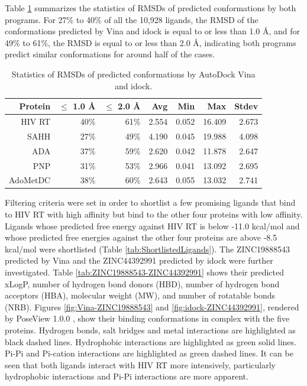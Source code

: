 Table \ref{tab:DockingRMSD} summarizes the statistics of RMSDs of predicted conformations by both programs. For 27\% to 40\% of all the 10,928 ligands, the RMSD of the conformations predicted by Vina and idock is equal to or less than 1.0 \AA, and for 49\% to 61\%, the RMSD is equal to or less than 2.0 \AA, indicating both programs predict similar conformations for around half of the cases.

\begin{table}
\centering
\begin{tabular*}
{\textwidth}
{@{\extracolsep{\fill}}rrrrrrr}
\toprule
Protein & $\leq$ 1.0 \AA & $\leq$ 2.0 \AA & Avg & Min & Max & Stdev\\
\midrule
HIV RT     & 40\% & 61\% & 2.554 & 0.052 & 16.409 & 2.673\\
SAHH       & 27\% & 49\% & 4.190 & 0.045 & 19.988 & 4.098\\
ADA         & 37\% & 59\% & 2.620 & 0.042 & 11.878 & 2.647\\
PNP          & 31\% & 53\% & 2.966 & 0.041 & 13.092 & 2.695\\
AdoMetDC & 38\% & 60\% & 2.643 & 0.055 & 13.032 & 2.741\\
\bottomrule
\end{tabular*}
\caption{Statistics of RMSDs of predicted conformations by AutoDock Vina and idock.}
\label{tab:DockingRMSD}
\end{table}

Filtering criteria were set in order to shortlist a few promising ligands that bind to HIV RT with high affinity but bind to the other four proteins with low affinity. Ligands whose predicted free energy against HIV RT is below -11.0 kcal/mol and whose predicted free energies against the other four proteins are above -8.5 kcal/mol were shortlisted (Table \ref{tab:ShortlistedLigands}). The ZINC19888543 predicted by Vina and the ZINC44392991 predicted by idock were further investigated. Table \ref{tab:ZINC19888543-ZINC44392991} shows their predicted xLogP, number of hydrogen bond donors (HBD), number of hydrogen bond acceptors (HBA), molecular weight (MW), and number of rotatable bonds (NRB). Figures \ref{fig:Vina-ZINC19888543} and \ref{fig:idock-ZINC44392991}, rendered by PoseView 1.0.0 \citep{748-2010}, show their binding conformations in complex with the five proteins. Hydrogen bonds, salt bridges and metal interactions are highlighted as black dashed lines. Hydrophobic interactions are highlighted as green solid lines. Pi-Pi and Pi-cation interactions are highlighted as green dashed lines. It can be seen that both ligands interact with HIV RT more intensively, particularly hydrophobic interactions and Pi-Pi interactions are more apparent.

